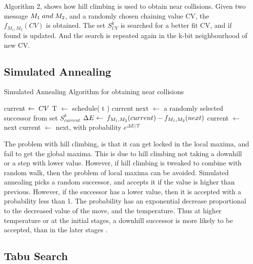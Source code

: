 \documentclass[12pt]{artikel3}                  %
\begin{document}
Algorithm 2, shows how hill climbing is used to obtain near collisions. Given two message $M_{1} \thickspace and \thickspace M_{2}$, 
and a randomly chosen chaining value CV, the $f_{M_{1}, M_{2}}(CV)$ is obtained. The set $S^{k}_{CV}$ is searched
for a better fit CV, and if found is updated. And the search is repeated again in the k-bit neighbourhood of new CV.

\subsection{Simulated Annealing}

\begin{algorithm}
  \caption{ Simulated Annealing Algorithm for obtaining near collisions }
  \begin{algorithmic}[1]
      \State current $\gets \thickspace CV$
        \State T $\gets$ schedule( t )
          \State \Return current
        \EndIf
        \State next $\gets$ a randomly selected successor from set $S^{k}_{current}$
        \State $\Delta E \gets  \thickspace f_{M_{1}, M_{2}}(current) - f_{M_{1}, M_{2}}(next)$
          \State current $\gets$ next
        \Else
          \State current $\gets$ next, with probability $e^{\Delta E / T}$
        \EndIf
      \EndFor
    \EndFunction
  \end{algorithmic}
\end{algorithm}

The problem with hill climbing, is that it can get locked in the local maxima, and fail to get the global maxima.
This is due to hill climbing not taking a downhill or a step with lower value. However, if hill climbing is 
tweaked to combine with random walk, then the problem of local maxima can be avoided. Simulated annealing picks
a random successor, and accepts it if the value is higher than previous. However, if the successor has a lower
value, then it is accepted with a probability less than 1. The probability has an exponential decrease proportional
to the decreased value of the move, and the temperature. Thus at higher temperature or at the initial stages, a
downhill successor is more likely to be accepted, than in the later stages \cite{00033}.

\subsection{Tabu Search}
\end{document}
